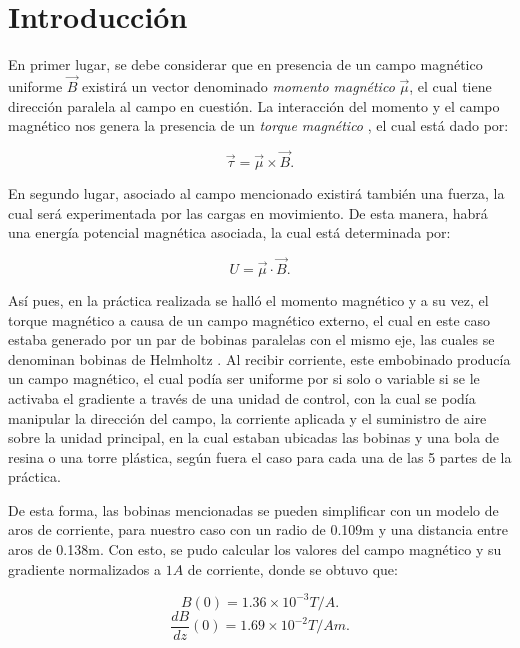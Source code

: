 \documentclass[%
 reprint,
 amsmath,amssymb,
 aps,
]{revtex4-1}
\begin{document}

\section{Introducción}

En primer lugar, se debe considerar que en presencia de un campo magnético uniforme $\vec{B}$ existirá un vector denominado \textit{momento magnético} $\vec{\mu}$, el cual tiene dirección paralela al campo en cuestión. La interacción del momento y el campo magnético nos genera la presencia de un \textit{torque magnético} \cite{torque}, el cual está dado por:

\begin{equation}
    \vec{\tau} = \vec{\mu} \times \vec{B}.
    \label{eq:torquemag}
\end{equation}

En segundo lugar, asociado al campo mencionado existirá también una fuerza, la cual será experimentada por las cargas en movimiento. De esta manera, habrá una energía potencial magnética asociada, la cual está determinada por:

\begin{equation}
U = \vec{\mu} \cdot \vec{B}.
\label{eq:enerpot}
\end{equation}

Así pues, en la práctica realizada se halló el momento magnético y a su vez, el torque magnético a causa de un campo magnético externo, el cual en este caso estaba generado por un par de bobinas paralelas con el mismo eje, las cuales se denominan bobinas de Helmholtz \cite{bobina}. Al recibir corriente, este embobinado producía un campo magnético, el cual podía ser uniforme por si solo o variable si se le activaba el gradiente a través de una unidad de control, con la cual se podía manipular la dirección del campo, la corriente aplicada y el suministro de aire sobre la unidad principal, en la cual estaban ubicadas las bobinas y una bola de resina o una torre plástica, según fuera el caso para cada una de las 5 partes de la práctica.

De esta forma, las bobinas mencionadas se pueden simplificar con un modelo de aros de corriente, para nuestro caso con un radio de 0.109m y una distancia entre aros de 0.138m. Con esto, se pudo calcular los valores del campo magnético y su gradiente normalizados a $1A$ de corriente, donde se obtuvo que:

\begin{equation}
    B(0) = 1.36 \times 10^{-3} T/A.
    \label{eq:campo}
\end{equation}
\begin{equation}
     \frac{dB}{dz}(0) = 1.69 \times 10^{-2} T/A m.
    \label{eq:gradiente}
\end{equation}
\end{document}
